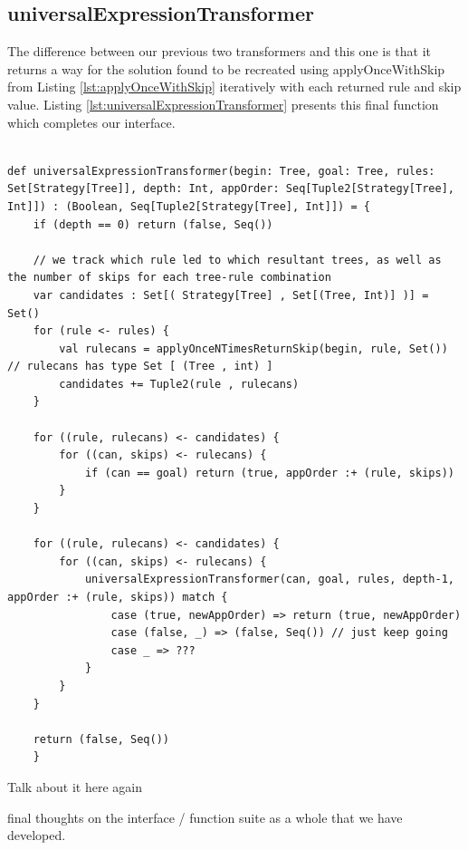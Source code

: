 \documentclass{l4proj}
\begin{document}
\subsection{universalExpressionTransformer}

The difference between our previous two transformers and this one is that it returns a way for the solution found to be recreated using applyOnceWithSkip from Listing \ref{lst:applyOnceWithSkip} iteratively with each returned rule and skip value. Listing \ref{lst:universalExpressionTransformer} presents this final function which completes our interface.

\begin{lstlisting}[caption={Our final traversal function, which returns the exact method of recreating a transformation from on expression to the other}, label={lst:universalExpressionTransformer}]
    
def universalExpressionTransformer(begin: Tree, goal: Tree, rules: Set[Strategy[Tree]], depth: Int, appOrder: Seq[Tuple2[Strategy[Tree], Int]]) : (Boolean, Seq[Tuple2[Strategy[Tree], Int]]) = {
    if (depth == 0) return (false, Seq())

    // we track which rule led to which resultant trees, as well as the number of skips for each tree-rule combination
    var candidates : Set[( Strategy[Tree] , Set[(Tree, Int)] )] = Set()
    for (rule <- rules) {
        val rulecans = applyOnceNTimesReturnSkip(begin, rule, Set()) // rulecans has type Set [ (Tree , int) ]
        candidates += Tuple2(rule , rulecans)
    }
    
    for ((rule, rulecans) <- candidates) {
        for ((can, skips) <- rulecans) {
            if (can == goal) return (true, appOrder :+ (rule, skips))
        }
    }
    
    for ((rule, rulecans) <- candidates) {
        for ((can, skips) <- rulecans) {
            universalExpressionTransformer(can, goal, rules, depth-1, appOrder :+ (rule, skips)) match {
                case (true, newAppOrder) => return (true, newAppOrder)
                case (false, _) => (false, Seq()) // just keep going
                case _ => ???
            }
        }
    }
    
    return (false, Seq())
    }
\end{lstlisting}


Talk about it here again




final thoughts on the interface / function suite as a whole that we have developed.
\end{document}
